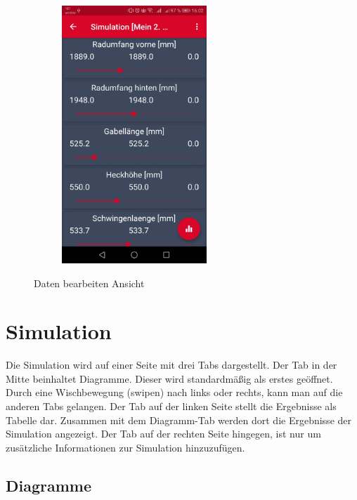 \begin{figure}[H]
\begin{subfigure}[b]{0.5\textwidth}
		\includegraphics[width=0.6\textwidth]{../include/images/funktionalitaet/dataBearbeiten}
	\end{subfigure}		
	
	\caption{Daten bearbeiten Ansicht}
\end{figure}
	
	
	\section{Simulation}
	\label{sec:sim}
	
	Die Simulation wird auf einer Seite mit drei Tabs dargestellt.  Der Tab in der Mitte beinhaltet Diagramme. Dieser wird standardmäßig als erstes geöffnet. Durch eine Wischbewegung (swipen) nach links oder rechts, kann man auf die anderen Tabs gelangen. Der Tab auf der linken Seite stellt die Ergebnisse als Tabelle dar. Zusammen mit dem Diagramm-Tab werden dort die Ergebnisse der Simulation angezeigt. Der Tab auf der rechten Seite hingegen, ist nur um zusätzliche Informationen zur Simulation hinzuzufügen.
	
		\subsection{Diagramme}
		\label{subsec:diagr}
		
